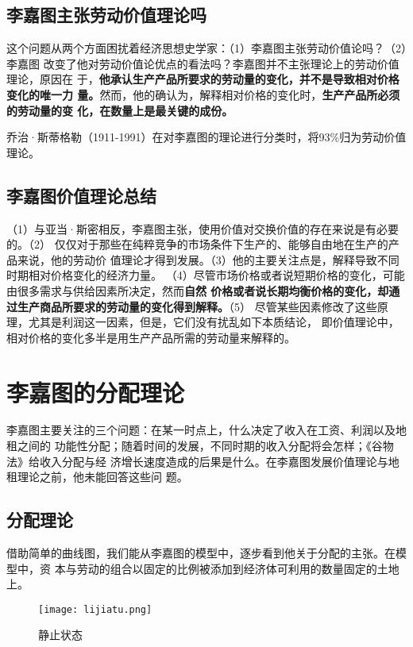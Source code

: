 \subsection{李嘉图主张劳动价值理论吗}

这个问题从两个方面困扰着经济思想史学家：（1）李嘉图主张劳动价值论吗？（2）李嘉图
改变了他对劳动价值论优点的看法吗？李嘉图并不主张理论上的劳动价值理论，原因在
于，\textbf{他承认生产产品所要求的劳动量的变化，并不是导致相对价格变化的唯一力
  量。}然而，他的确认为，解释相对价格的变化时，\textbf{生产产品所必须的劳动量的变
  化，在数量上是最关键的成份。}

乔治·斯蒂格勒（1911-1991）在对李嘉图的理论进行分类时，将93\%归为劳动价值理论。

\subsection{李嘉图价值理论总结}

（1）与亚当·斯密相反，李嘉图主张，使用价值对交换价值的存在来说是有必要的。（2）
仅仅对于那些在纯粹竞争的市场条件下生产的、能够自由地在生产的产品来说，他的劳动价
值理论才得到发展。（3）他的主要关注点是，解释导致不同时期相对价格变化的经济力量。
（4）尽管市场价格或者说短期价格的变化，可能由很多需求与供给因素所决定，然而\textbf{自然
价格或者说长期均衡价格的变化，却通过生产商品所要求的劳动量的变化得到解释。}（5）
尽管某些因素修改了这些原理，尤其是利润这一因素，但是，它们没有扰乱如下本质结论，
即价值理论中，相对价格的变化多半是用生产产品所需的劳动量来解释的。

\section{李嘉图的分配理论}

李嘉图主要关注的三个问题：在某一时点上，什么决定了收入在工资、利润以及地租之间的
功能性分配；随着时间的发展，不同时期的收入分配将会怎样；《谷物法》给收入分配与经
济增长速度造成的后果是什么。在李嘉图发展价值理论与地租理论之前，他未能回答这些问
题。

\subsection{分配理论}

借助简单的曲线图，我们能从李嘉图的模型中，逐步看到他关于分配的主张。在模型中，资
本与劳动的组合以固定的比例被添加到经济体可利用的数量固定的土地上。

\begin{figure}[ht]
  \centering
  \texttt{[image: lijiatu.png]}
  \caption{\label{fig:lijiatu}静止状态 }
\end{figure}

